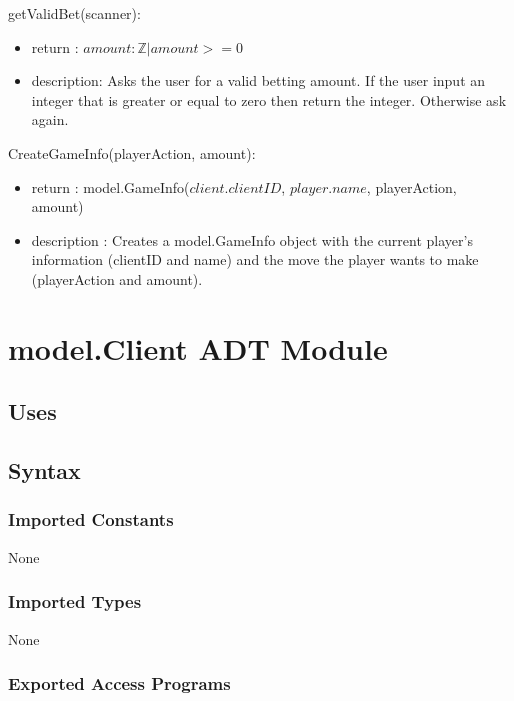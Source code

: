 \documentclass[12pt, titlepage]{article}
\begin{document}
        \noindent getValidBet(scanner):
        \begin{itemize}
        \item return : $amount : \mathbb{Z} | amount >= 0$
        \item description: Asks the user for a valid betting amount. If the user input an integer that is greater or equal to zero then return the integer. Otherwise ask again.
        \end{itemize}
        
        \noindent CreateGameInfo(playerAction, amount):
        \begin{itemize}
        \item return : model.GameInfo($client.clientID$, $player.name$, playerAction, amount)
        \item description : Creates a model.GameInfo object with the current player's information (clientID and name) and the move the player wants to make (playerAction and amount).
        \end{itemize}
        
                
        
\section* {model.Client ADT Module}
    \subsection* {Uses}
    \subsection* {Syntax}
    
        \subsubsection* {Imported Constants}
            None
        \subsubsection* {Imported Types}
            None
        \subsubsection* {Exported Access Programs}
        
\end{document}
